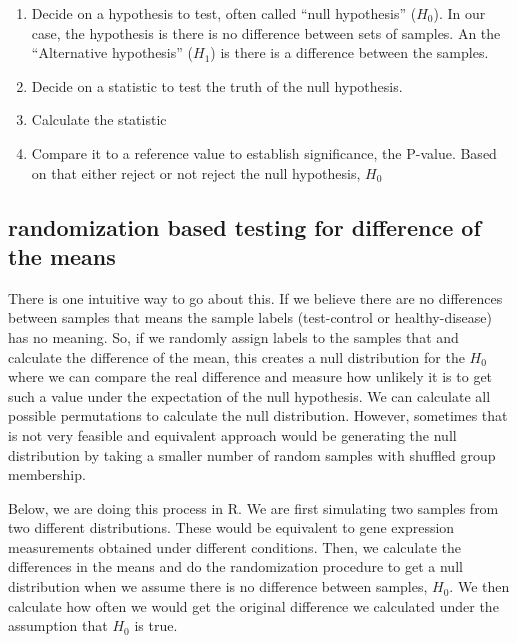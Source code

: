 \documentclass[12pt,]{krantz}
\providecommand{\tightlist}{%
  \setlength{\itemsep}{0pt}\setlength{\parskip}{0pt}}
\begin{document}
\begin{enumerate}
\def\labelenumi{\arabic{enumi}.}
\tightlist
\item
  Decide on a hypothesis to test, often called ``null hypothesis'' (\(H_0\)). In our
  case, the hypothesis is there is no difference between sets of samples. An the ``Alternative hypothesis'' (\(H_1\)) is there is a difference between the
  samples.
\item
  Decide on a statistic to test the truth of the null hypothesis.
\item
  Calculate the statistic
\item
  Compare it to a reference value to establish significance, the P-value. Based on that either reject or not reject the null hypothesis, \(H_0\)
\end{enumerate}

\hypertarget{randomization-based-testing-for-difference-of-the-means}{%
\subsection{randomization based testing for difference of the means}\label{randomization-based-testing-for-difference-of-the-means}}

There is one intuitive way to go about this. If we believe there are no
differences between samples that means the sample labels (test-control or
healthy-disease) has no meaning. So, if we randomly assign labels to the
samples
that and calculate the difference of the mean, this creates a null
distribution for the \(H_0\) where we can compare the real difference and
measure how unlikely it is to get such a value under the expectation of the
null hypothesis. We can calculate all possible permutations to calculate
the null distribution. However, sometimes that is not very feasible and
equivalent approach would be generating the null distribution by taking a
smaller number of random samples with shuffled group membership.

Below, we are doing this process in R. We are first simulating two samples
from two different distributions.
These would be equivalent to gene expression measurements obtained under
different conditions. Then, we calculate the differences in the means
and do the randomization procedure to get a null distribution when we
assume there is no difference between samples, \(H_0\). We then calculate how
often we would get the original difference we calculated under the
assumption that \(H_0\) is true.
\end{document}
